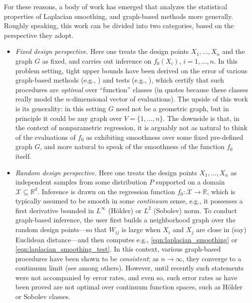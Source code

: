 \documentclass[twoside]{article}
\newcommand{\Reals}{\mathbb{R}}
\newcommand{\1}{\mathbf{1}}
\newcommand{\Rd}{\Reals^d}
\newcommand{\Xset}{\mathcal{X}}
\newcommand{\Leb}{L}
\theoremstyle{definition}
\theoremstyle{remark}
\begin{document}
For these reasons, a body of work has emerged that analyzes the statistical properties of Laplacian smoothing, and graph-based methods more generally. Roughly speaking, this work can be divided into two categories, based on the perspective they adopt. 
\begin{itemize}
	\item \emph{Fixed design perspective.} Here one treats the design points $X_1,\ldots,X_n$ and the graph $G$ as fixed, and carries out inference on $f_0(X_i)$, $i=1,\ldots,n$. In this problem setting, tight upper bounds have been derived on the error of various graph-based methods (e.g., \citet{wang2016,hutter2016,sadhanala16,sadhanala17,kirichenko2017,kirichenko2018}) and tests (e.g., \citet{sharpnack2010identifying,sharpnack2013b,sharpnack2013,sharpnack2015}), which certify that such procedures are \emph{optimal} over ``function'' classes (in quotes because these classes really model the $n$-dimensional vector of evaluations). The upside of this work is its generality: in this setting $G$ need not be a geometric graph, but in principle it could be any graph over $V=\{1,\ldots,n\}$. The downside is that, in the context of nonparametric regression, it is arguably not as natural to think of the evaluations of $f_0$ as exhibiting smoothness over some fixed pre-defined graph $G$, and more natural to speak of the smoothness of the function $f_0$ itself. 
	\item \emph{Random design perspective.} Here one treats the design points $X_1,\ldots,X_n$ as independent samples from some distribution $P$ supported on a domain $\Xset \subseteq \Rd$. Inference is drawn on the regression function $f_0: \Xset \to \Reals$, which is typically assumed to be smooth in some \emph{continuum} sense, e.g., it possesses a first derivative bounded in $L^{\infty}$ (H\"{o}lder) or $\Leb^2$ (Sobolev) norm. To conduct graph-based inference, the user first builds a neighborhood graph over the random design points---so that $W_{ij}$ is large when $X_i$ and $X_j$ are close in (say) Euclidean distance---and then computes e.g., \eqref{eqn:laplacian_smoothing} or \eqref{eqn:laplacian_smoothing_test}. In this context, various graph-based procedures have been shown to be \emph{consistent}: as $n \to \infty$, they converge to a continuum limit (see \citet{belkin07,vonluxburg2008,trillos2018} among others). However, until recently such statements were not accompanied by error rates, and even so, such error rates as have been proved \citep{lee2016,trillos2020} are not optimal over continuum function spaces, such as H\"{o}lder or Sobolev classes. 
\end{itemize}
\end{document}
